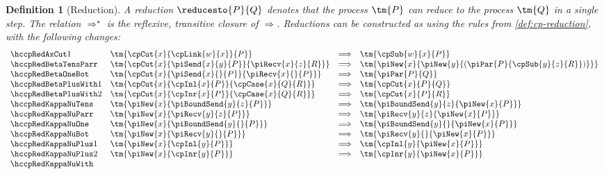 \documentclass[submission,copyright,creativecommons]{eptcs}
\newtheorem{definition}{Definition}
\begin{document}
\begin{definition}[Reduction]\label{def:hcp-reduction}
  A reduction $\reducesto{P}{Q}$ denotes that the process $\tm{P}$ can reduce
  to the process $\tm{Q}$ in a single step.
  The relation $\Longrightarrow^\star$ is the reflexive, transitive closure of
  $\Longrightarrow$.
  Reductions can be constructed as using the rules from \cref{def:cp-reduction},
  with the following changes:
  \begin{gather*}
    \begin{array}{llcll}
      \hccpRedAxCut1
      & \tm{\cpCut{x}{\cpLink{w}{x}}{P}}
      & \Longrightarrow
      & \tm{\cpSub{w}{x}{P}} 
      \\
      \hccpRedBetaTensParr
      & \tm{\cpCut{x}{\piSend{x}{y}{P}}{\piRecv{x}{z}{R}}}
      & \Longrightarrow
      & \tm{\piNew{x}{\piNew{y}{(\piPar{P}{\cpSub{y}{z}{R}})}}}
      \\
      \hccpRedBetaOneBot
      & \tm{\cpCut{x}{\piSend{x}{}{P}}{\piRecv{x}{}{P}}}
      & \Longrightarrow
      & \tm{\piPar{P}{Q}}
      \\
      \hccpRedBetaPlusWith1
      & \tm{\cpCut{x}{\cpInl{x}{P}}{\cpCase{x}{Q}{R}}}
      & \Longrightarrow
      & \tm{\cpCut{x}{P}{Q}}
      \\
      \hccpRedBetaPlusWith2
      & \tm{\cpCut{x}{\cpInr{x}{P}}{\cpCase{x}{Q}{R}}}
      & \Longrightarrow
      & \tm{\cpCut{x}{P}{R}}
      \\
      \hccpRedKappaNuTens
      & \tm{\piNew{x}{\piBoundSend{y}{z}{P}}}
      & \Longrightarrow
      & \tm{\piBoundSend{y}{z}{\piNew{x}{P}}}
      \\
      \hccpRedKappaNuParr
      & \tm{\piNew{x}{\piRecv{y}{z}{P}}}
      & \Longrightarrow
      & \tm{\piRecv{y}{z}{\piNew{x}{P}}}
      \\
      \hccpRedKappaNuOne
      & \tm{\piNew{x}{\piBoundSend{y}{}{P}}}
      & \Longrightarrow
      & \tm{\piBoundSend{y}{}{\piNew{x}{P}}}
      \\
      \hccpRedKappaNuBot
      & \tm{\piNew{x}{\piRecv{y}{}{P}}}
      & \Longrightarrow
      & \tm{\piRecv{y}{}{\piNew{x}{P}}}
      \\
      \hccpRedKappaNuPlus1
      & \tm{\piNew{x}{\cpInl{y}{P}}}
      & \Longrightarrow
      & \tm{\cpInl{y}{\piNew{x}{P}}}
      \\
      \hccpRedKappaNuPlus2
      & \tm{\piNew{x}{\cpInr{y}{P}}}
      & \Longrightarrow
      & \tm{\cpInr{y}{\piNew{x}{P}}}
      \\
      \hccpRedKappaNuWith

\end{array}
\end{gather*}
\end{definition}
\end{document}
